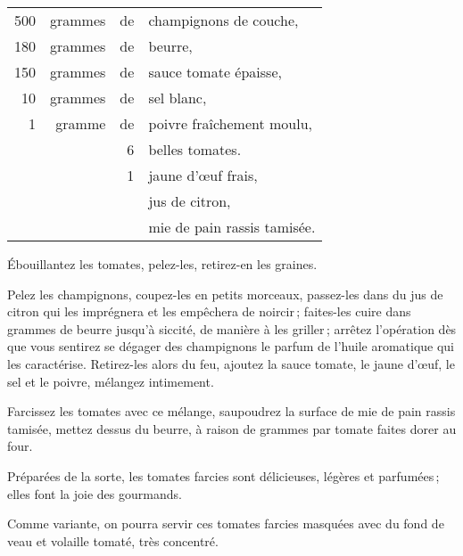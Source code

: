 \footnotesize
\begin{longtable}{rrrp{16em}}
    500 & grammes & de & champignons de couche,                                                           \\
    180 & grammes & de & beurre,                                                                          \\
    150 & grammes & de & sauce tomate épaisse,                                                            \\
     10 & grammes & de & sel blanc,                                                                       \\
      1 & gramme  & de & poivre fraîchement moulu,                                                        \\
        &         &  6 & belles tomates.                                                                  \\
        &         &  1 & jaune d'œuf frais,                                                               \\
        &         &    & jus de citron,                                                                   \\
        &         &    & mie de pain rassis tamisée.                                                      \\
\end{longtable}
\normalsize

Ébouillantez les tomates, pelez-les, retirez-en les graines.

Pelez les champignons, coupez-les en petits morceaux, passez-les dans du jus de
citron qui les imprégnera et les empêchera de noircir ; faites-les cuire dans
{\mmm} grammes de beurre jusqu'à siccité, de manière à les griller ;
arrêtez l'opération dès que vous sentirez se dégager des champignons le parfum
de l'huile aromatique qui les caractérise. Retirez-les alors du feu, ajoutez la
sauce tomate, le jaune d'œuf, le sel et le poivre, mélangez intimement.

Farcissez les tomates avec ce mélange, saupoudrez la surface de mie de pain
rassis tamisée, mettez dessus du beurre, à raison de {\mmm} grammes par
tomate faites dorer au four.

Préparées de la sorte, les tomates farcies sont délicieuses, légères et
parfumées ; elles font la joie des gourmands.

\sk

Comme variante, on pourra servir ces tomates farcies masquées avec du fond de
veau et volaille tomaté, très concentré.

